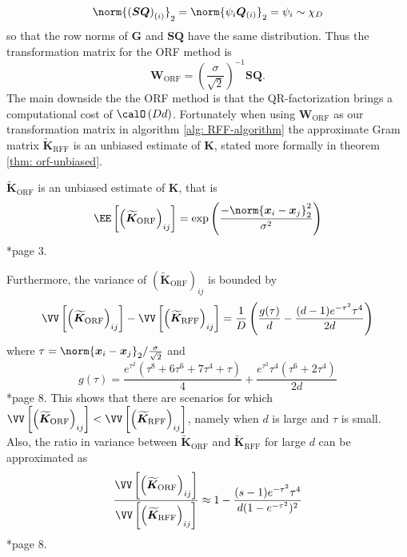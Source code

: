 \[
    \norm{\left(\bm{S} \bm{Q}\right)_{(i)}}_2 = \norm{\psi_i \bm{Q}_{(i)}}_2 = \psi_i \sim \chi_D
\]
so that the row norms of $\bm{G}$ and $\bm{S} \bm{Q}$ have the same distribution. Thus the transformation matrix for the ORF method is
\begin{equation}
    \bm{W}_{\text{ORF}} = \left( \frac{\sigma}{\sqrt{2}} \right)^{-1} \bm{S} \bm{Q}.
\end{equation}
The main downside the the ORF method is that the QR-factorization brings a computational cost of $\calO \left( Dd \right)$. Fortunately when using $\bm{W}_{\text{ORF}}$ as our transformation matrix in algorithm \ref{alg: RFF-algorithm} the approximate Gram matrix $\bm{\widetilde{K}}_{\text{RFF}}$ is an unbiased estimate of $\bm{K}$, stated more formally in theorem \ref{thm: orf-unbiased}.

\begin{thm} \label{thm: orf-unbiased}
    $\bm{\widetilde{K}}_{\text{ORF}}$ is an unbiased estimate of $\bm{K}$, that is
    \[
        \EE \left[ \left( \bm{\widetilde{K}}_{\text{ORF}} \right)_{ij} \right] = \exp \left( \frac{- \norm{\bm{x}_i - {\bm{x}_j}}_{2}^{2}}{\sigma^2} \right)
    \] \cite{YuFelixX2016ORF}*{page 3}.
\end{thm}

Furthermore, the variance of $\left( \bm{\widetilde{K}}_{\text{ORF}} \right)_{ij}$ is bounded by
\[
    \VV \left[ \left( \bm{\widetilde{K}}_{\text{ORF}} \right)_{ij} \right] - \VV \left[ \left( \bm{\widetilde{K}}_{\text{RFF}} \right)_{ij} \right] = \frac{1}{D} \left( \frac{g (\tau)}{d} - \frac{(d-1)e^{-\tau^2}\tau^4}{2d} \right)
\]
where $\tau = \norm{\bm{x}_i - \bm{x}_j}_2 / \frac{\sigma}{\sqrt{2}}$ and
\[
    g (\tau) = \frac{e^{\tau^2} \left( \tau^8 + 6 \tau^6 + 7 \tau^4 + \tau \right)}{4} + \frac{e^{\tau^2} \tau^4 \left( \tau^6 + 2 \tau^4 \right)}{2d}
\]
\cite{LiuFanghui2021RFfK}*{page 8}. This shows that there are scenarios for which $\VV \left[ \left( \bm{\widetilde{K}}_{\text{ORF}} \right)_{ij} \right] < \VV \left[ \left( \bm{\widetilde{K}}_{\text{RFF}} \right)_{ij} \right]$, namely when $d$ is large and $\tau$ is small. Also, the ratio in variance between $\bm{\widetilde{K}}_{\text{ORF}}$ and $\bm{\widetilde{K}}_{\text{RFF}}$ for large $d$ can be approximated as
\[
    \frac{\VV \left[ \left( \bm{\widetilde{K}}_{\text{ORF}} \right)_{ij} \right]}{\VV \left[ \left( \bm{\widetilde{K}}_{\text{RFF}} \right)_{ij} \right]} \approx 1 - \frac{(s-1)e^{-\tau^2}\tau^4}{d(1-e^{-\tau^2})^2}
\]
\cite{LiuFanghui2021RFfK}*{page 8}.